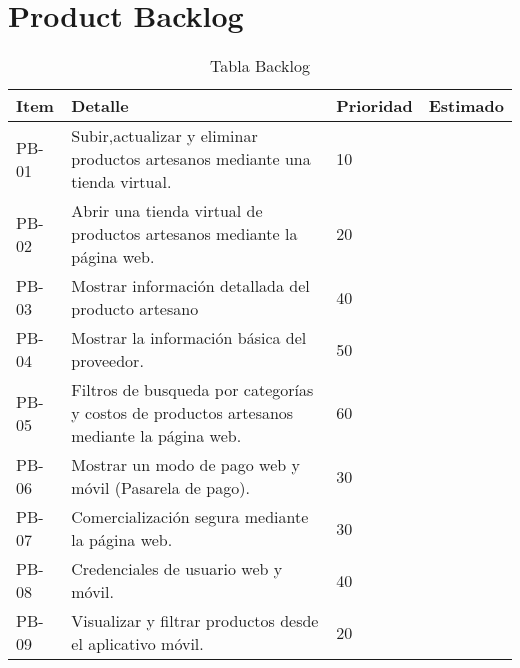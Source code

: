 \chapter{Product Backlog}


\begin{table}[htbp]
	\begin{center}
		\begin{tabular}{|p{2.5cm}|p{6.5cm}|p{2.5cm}|p{2.5cm}|}
			\hline
			Item & Detalle & Prioridad & Estimado\\
			\hline \hline
			PB-01 & Subir,actualizar y eliminar  productos artesanos mediante una tienda virtual. & 10 & \\ \hline
		    PB-02 & Abrir una tienda virtual de productos artesanos mediante la página web. & 20 & \\ \hline
			PB-03 & Mostrar información detallada del producto artesano & 40 & \\ \hline
			PB-04 & Mostrar la información básica del proveedor. & 50 & \\ \hline
			PB-05 & Filtros de busqueda por categorías y costos de productos artesanos mediante la página web. & 60 & \\ \hline
			PB-06 & Mostrar un modo de pago web y móvil (Pasarela de pago). & 30 & \\ \hline
			PB-07 & Comercialización segura mediante la página web. & 30 & \\ \hline
			PB-08 & Credenciales de usuario web y móvil. & 40 & \\ \hline
			PB-09 & Visualizar y filtrar productos desde el aplicativo móvil. & 20 & \\ \hline			
			
			
		\end{tabular}
		\caption{Tabla Backlog}
		\label{tabla:sencilla}
	\end{center}
\end{table}